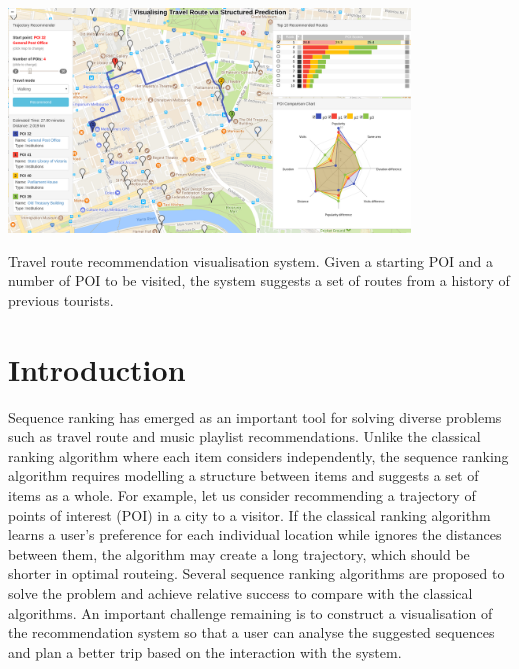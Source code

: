 \documentclass[sigconf]{acmart}
\begin{document}


 \begin{teaserfigure}
 \centering
   \includegraphics[width=0.8\textwidth]{figure/sample_map.png}
   \caption{Travel route recommendation visualisation system. Given a starting POI and a number of POI to be visited, the system suggests a set of routes from a history of previous tourists.}
   \label{fig:overview}
 \end{teaserfigure}

\maketitle


\section{Introduction}
Sequence ranking has emerged as an important tool for solving diverse problems such as travel route and music playlist recommendations. Unlike the classical ranking algorithm where each item considers independently, the sequence ranking algorithm requires modelling a structure between items and suggests a set of items as a whole. For example, let us consider recommending a trajectory of points of interest (POI) in a city to a visitor. If the classical ranking algorithm learns a user's preference for each individual location while ignores the distances between them, the algorithm may create a long trajectory, which should be shorter in optimal routeing. Several sequence ranking algorithms are proposed to solve the problem and achieve relative success to compare with the classical algorithms. An important challenge remaining is to construct a visualisation of the recommendation system so that a user can analyse the suggested sequences and plan a better trip based on the interaction with the system.
\end{document}
